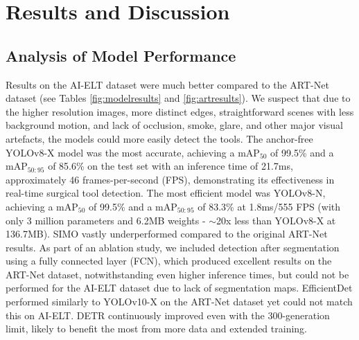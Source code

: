 \section{Results and Discussion}

\subsection{Analysis of Model Performance}

Results on the AI-ELT dataset were much better compared to the ART-Net dataset (see Tables \ref{fig:modelresults} and \ref{fig:artresults}). We suspect that due to the higher resolution images, more distinct edges, straightforward scenes with less background motion, and lack of occlusion, smoke, glare, and other major visual artefacts, the models could more easily detect the tools. The anchor-free YOLOv8-X model was the most accurate, achieving a mAP$_{50}$ of 99.5\% and a mAP$_{50:95}$ of 85.6\% on the test set with an inference time of 21.7ms, approximately 46 frames-per-second (FPS), demonstrating its effectiveness in real-time surgical tool detection. The most efficient model was YOLOv8-N, achieving a mAP$_{50}$ of 99.5\% and a mAP$_{50:95}$ of 83.3\% at 1.8ms/555 FPS (with only 3 million parameters and 6.2MB weights - $\sim$20x less than YOLOv8-X at 136.7MB). SIMO vastly underperformed compared to the original ART-Net results. As part of an ablation study, we included detection after segmentation using a fully connected layer (FCN), which produced excellent results on the ART-Net dataset, notwithstanding even higher inference times, but could not be performed for the AI-ELT dataset due to lack of segmentation maps. EfficientDet performed similarly to YOLOv10-X on the ART-Net dataset yet could not match this on AI-ELT. DETR continuously improved even with the 300-generation limit, likely to benefit the most from more data and extended training. 

